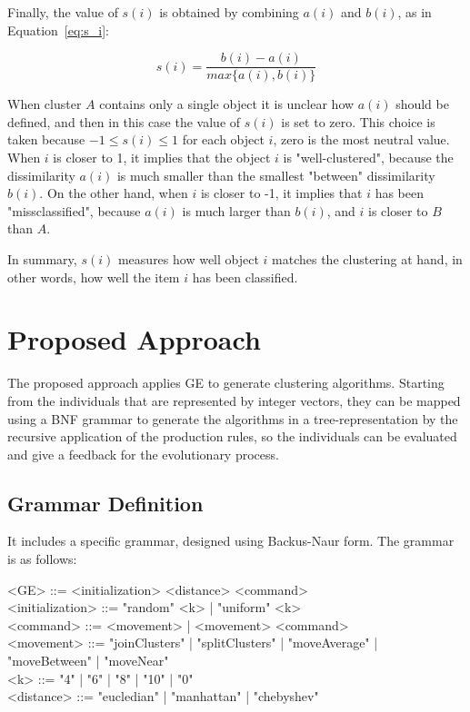 \documentclass[conference,compsoc]{IEEEtran}
\begin{document}
Finally, the value of $s(i)$ is obtained by combining $a(i)$ and $b(i)$, as in  Equation~\ref{eq:s_i}:


\begin{equation} \label{eq:s_i}
	s(i) = \frac{b(i) - a(i)}{max\{a(i), b(i)\}}
\end{equation}


When cluster $A$ contains only a single object it is unclear how $a(i)$ should be defined, and then in this case the value of $s(i)$ is set to zero. This choice is taken because $-1 \le s(i) \le 1$ for each object $i$, zero is the most neutral value. When $i$ is closer to 1, it implies that the object $i$ is "well-clustered", because the dissimilarity $a(i)$ is much smaller than the smallest "between" dissimilarity $b(i)$. On the other hand, when $i$ is closer to -1, it implies that $i$ has been "missclassified", because $a(i)$ is much larger than $b(i)$, and $i$ is closer to $B$ than $A$.


In summary, $s(i)$ measures how well object $i$ matches the clustering at hand, in other words, how well the item $i$ has been classified.


\section{Proposed Approach} \label{sec:methodology}


The proposed approach applies GE to generate clustering algorithms. Starting from the individuals that are represented by integer vectors, they can be mapped using a BNF grammar to generate the algorithms in a tree-representation by the recursive application of the production rules, so the individuals can be evaluated and give a feedback for the evolutionary process.


\subsection{Grammar Definition}


It includes a specific grammar, designed  using  Backus-Naur form. The grammar is as follows:


\begin{grammar}
	<GE> ::= <initialization> <distance> <command> 
	\\ <initialization> ::= "random" <k> | "uniform" <k>
	\\ <command> ::= <movement> | <movement> <command>
	\\ <movement> ::= "joinClusters" | "splitClusters" | "moveAverage" | "moveBetween" | "moveNear" 
	\\ <k> ::= "4" | "6" | "8" | "10" | "0"
	\\ <distance> ::= "eucledian" | "manhattan" | "chebyshev"
	\label{ge-clustering-grammar}
\end{grammar}
\end{document}

